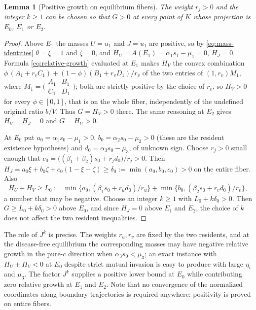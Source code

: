 \documentclass[11pt,a4paper]{article}
\theoremstyle{plain}
\newtheorem{lemma}[theorem]{Lemma}
\theoremstyle{definition}
\theoremstyle{remark}
\begin{document}
\begin{lemma}[Positive growth on equilibrium fibers]\label{lem:fibers}
The weight $r_j>0$ and the integer $k\ge1$ can be chosen so that $G>0$ at every point of $K$ whose projection is $E_0$, $E_1$ or $E_2$.
\end{lemma}
\begin{proof}
Above $E_1$ the masses $U=u_1$ and $J=u_1$ are positive, so by \eqref{eq:mass-identities} $\theta=\xi=1$ and $\zeta=0$, and $H_U=A(E_1)=\alpha_1s_1-\mu_1=0$, $H_J=0$. Formula \eqref{eq:relative-growth} evaluated at $E_1$ makes $H_V$ the convex combination $\phi\,(A_1+r_vC_1)+(1-\phi)(B_1+r_vD_1)/r_v$ of the two entries of $(1,r_v)M_1$, where $M_1=\bigl(\begin{smallmatrix}A_1&B_1\\C_1&D_1\end{smallmatrix}\bigr)$; both are strictly positive by the choice of $r_v$, so $H_V>0$ for every $\phi\in[0,1]$, that is on the whole fiber, independently of the undefined original ratio $b/V$. Thus $G=H_V>0$ there. The same reasoning at $E_2$ gives $H_V=H_J=0$ and $G=H_U>0$.

At $E_0$ put $a_0=\alpha_1s_0-\mu_1>0$, $b_0=\alpha_2s_0-\mu_2>0$ (these are the resident existence hypotheses) and $d_0=\alpha_3s_0-\mu_3$, of unknown sign. Choose $r_j>0$ small enough that $c_0=\bigl((\beta_1+\beta_2)s_0+r_jd_0\bigr)/r_j>0$. Then $H_J=a_0\xi+b_0\zeta+c_0(1-\xi-\zeta)\ge\delta_0:=\min(a_0,b_0,c_0)>0$ on the entire fiber. Also
\[
 H_U+H_V\ge L_0:=\min\{a_0,(\beta_1s_0+r_ud_0)/r_u\}+\min\{b_0,(\beta_2s_0+r_vd_0)/r_v\},
\]
a number that may be negative. Choose an integer $k\ge1$ with $L_0+k\delta_0>0$. Then $G\ge L_0+k\delta_0>0$ above $E_0$, and since $H_J=0$ above $E_1$ and $E_2$, the choice of $k$ does not affect the two resident inequalities.
\end{proof}

The role of $J^k$ is precise. The weights $r_u,r_v$ are fixed by the two residents, and at the disease-free equilibrium the corresponding masses may have negative relative growth in the pure-$c$ direction when $\alpha_3s_0<\mu_3$; an exact instance with $H_U+H_V<0$ at $E_0$ despite strict mutual invasion is easy to produce with large $\eta_i$ and $\mu_3$. The factor $J^k$ supplies a positive lower bound at $E_0$ while contributing zero relative growth at $E_1$ and $E_2$. Note that no convergence of the normalized coordinates along boundary trajectories is required anywhere: positivity is proved on entire fibers.
\end{document}
